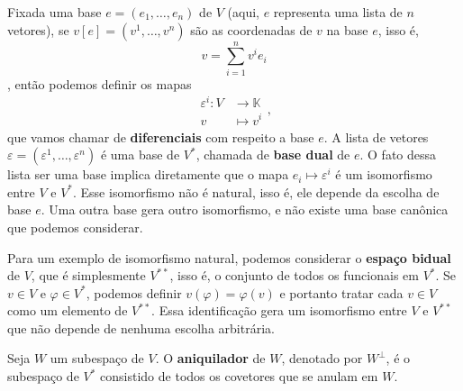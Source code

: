 \documentclass{article}
\renewcommand{\phi}{\varphi}
\begin{document}
Fixada uma base $e = (e_1, \dots, e_n)$ de $V$ (aqui, $e$ representa uma lista de $n$ vetores), se $v[e] = (v^1, \dots, v^n)$ são as coordenadas de $v$ na base $e$, isso é, \begin{equation}
    v = \sum_{i = 1}^n v^i e_i
\end{equation}, então podemos definir os mapas \begin{equation}
    \begin{split}
        \varepsilon^i \colon V &\to \mathbb{K} \\ v &\mapsto v^i
    \end{split},
\end{equation} que vamos chamar de \textbf{diferenciais} com respeito a base $e$. A lista de vetores $\varepsilon = (\varepsilon^1, \dots, \varepsilon^n)$ é uma base de $V^*$, chamada de \textbf{base dual} de $e$. O fato dessa lista ser uma base implica diretamente que o mapa $e_i \mapsto \varepsilon^i$ é um isomorfismo entre $V$ e $V^*$. Esse isomorfismo não é natural, isso é, ele depende da escolha de base $e$. Uma outra base gera outro isomorfismo, e não existe uma base canônica que podemos considerar.

Para um exemplo de isomorfismo natural, podemos considerar o \textbf{espaço bidual} de $V$, que é simplesmente $V^{**}$, isso é, o conjunto de todos os funcionais em $V^*$. Se $v \in V$ e $\phi \in V^*$, podemos definir $v(\phi) = \phi(v)$ e portanto tratar cada $v \in V$ como um elemento de $V^{**}$. Essa identificação gera um isomorfismo entre $V$ e $V^{**}$ que não depende de nenhuma escolha arbitrária.

Seja $W$ um subespaço de $V$. O \textbf{aniquilador} de $W$, denotado por $W^\perp$, é o subespaço de $V^*$ consistido de todos os covetores que se anulam em $W$.
\end{document}
